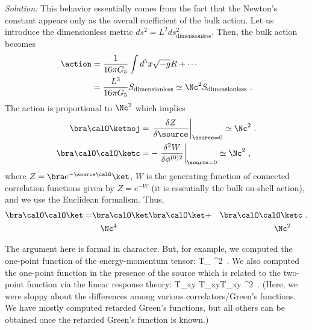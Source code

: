 {\color{blue} 
\textit{Solution:}
This behavior essentially comes from the fact that the Newton's constant appears only as the overall coefficient of the bulk action. Let us introduce the dimensionless metric $ds^2 =L^2 ds^2_\text{dimensionless}$. Then, the bulk action becomes
\begin{align}
%
\action &= \frac{1}{16\pi G_5} \int d^5x \sqrt{-g} R + \cdots 
\\
&= \frac{L^3}{16\pi G_5} S_\text{dimensionless}
\simeq \Nc^2 S_\text{dimensionless}~.
%
\end{align}
The action is proportional to $\Nc^2$
which implies
\begin{align}
%
\bra \calO \ketnoj &
= \left.\frac{\delta Z}{\delta \source}\right|_{\source=0} 
\simeq \Nc^2~.\\
\bra \calO\calO \ketc &
= -\left.\frac{\delta^2 W}{\delta \phi^{(0)2}}\right|_{\source=0} 
\simeq \Nc^2~,
%
\end{align}
where $Z = \bra e^{-\source\calO} \ket$, $W$ is the generating function of connected correlation functions given by $Z=e^{-W}$ (it is essentially the bulk on-shell action), and we use the Euclidean formalism.
Thus,
\begin{alignat}{2}
%
\bra\calO\calO\ket  
 = &\bra \calO \ket \bra \calO \ket 
 + &\bra \calO\calO \ketc~. \\
 &\quad\Nc^4 & \Nc^2 \qquad\nonumber
%
\end{alignat}


The argument here is formal in character. But, for example, we computed the one-point function of the energy-momentum tensor:
\be
%
\bra T_{\mu\nu}\ket 
 \simeq \Nc^2~.
%
\ee
We also computed the one-point function in the presence of the source which is related to the two-point function via the linear response theory:
\be
%
\delta \bra T_{xy}\ket
 \simeq \bra T_{xy}T_{xy}\ketc
 \simeq \Nc^2~.
%
\ee
%
%
(Here, we were sloppy about the differences among various correlators/Green's functions. We have mostly computed retarded Green's functions, but all others can be obtained once the retarded Green's function is known.)
}


